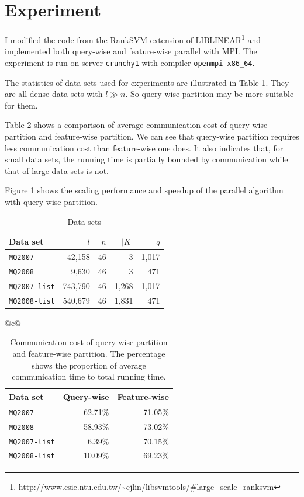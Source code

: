 \documentclass[11pt, oneside]{article}   	%
\def\mqs{\texttt {MQ2007}}
\def\mqe{\texttt {MQ2008}}
\def\mqlists{\texttt {MQ2007-list}}
\def\mqliste{\texttt {MQ2008-list}}
\begin{document}
\section{Experiment}
I modified the code from the RankSVM extension of LIBLINEAR\footnote{\url{http://www.csie.ntu.edu.tw/~cjlin/libsvmtools/#large_scale_ranksvm}} and implemented both query-wise and feature-wise parallel with MPI. The experiment is run on server \texttt{crunchy1} with compiler \texttt{openmpi-x86\_64}.

The statistics of data sets used for experiments are illustrated in Table 1. They are all dense data sets with $l \gg n$. So query-wise partition may be more suitable for them. 

Table 2 shows a comparison of average communication cost of query-wise partition and feature-wise partition. We can see that query-wise partition requires less communication cost than feature-wise one does. It also indicates that, for small data sets, the running time is partially bounded by communication while that of large data sets is not. 

Figure 1 shows the scaling performance and speedup of the parallel algorithm with query-wise partition. 
\begin{table}
\centering
\caption{Data sets}
		\begin{tabular}{ l|rrrr }\hline
		Data set & $l$ & $n$ & $|K|$ & $q$ \\ \hline
		\mqs & 42,158 & 46 & 3 & 1,017 \\
		\mqe & 9,630 & 46 & 3 & 471 \\
		\mqlists & 743,790 & 46 & 1,268 & 1,017 \\
		\mqliste & 540,679 & 46 & 1,831 & 471  \\\hline
		\end{tabular}
	\end{table}

	\begin{table}
	\centering
	\caption{Communication cost of query-wise partition and feature-wise partition. The percentage shows the proportion of average communication time to total running time.}
	\begin{tabular}{@{}c@{}}
	\begin{tabular}{ l|rr}\hline
		Data set & Query-wise & Feature-wise  \\ \hline
		\mqs & 62.71\% & 71.05\%  \\
		\mqe & 58.93\% & 73.02\%\\
		\mqlists & 6.39\% & 70.15\%  \\
		\mqliste & 10.09\% & 69.23\% \\\hline
		\end{tabular}
	\end{tabular}
	\end{table}
	
\end{document}

